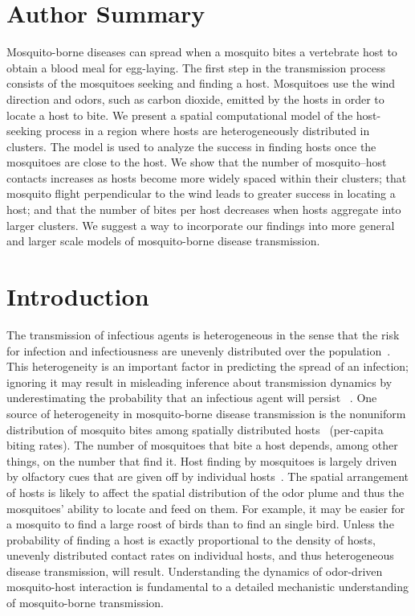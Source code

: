 \documentclass[10pt]{article}
\begin{document}
\section*{Author Summary}
Mosquito-borne diseases can spread when a mosquito bites a vertebrate host to obtain a blood meal for egg-laying.  The first step in the transmission process consists of the mosquitoes seeking and finding a host.  Mosquitoes use the wind direction and odors, such as carbon dioxide, emitted by the hosts in order to locate a host to bite.  We present a spatial computational model of the host-seeking process in a region where hosts are heterogeneously distributed in clusters.  The model is used to analyze the success in finding hosts once the mosquitoes are close to the host.  
We show that the number of mosquito--host contacts increases as hosts become more widely spaced within their clusters; that mosquito flight perpendicular to the wind leads to greater success in locating a host; and that the number of bites per host decreases when hosts aggregate into larger clusters. We suggest a way to incorporate our findings into more general and larger scale models of mosquito-borne disease transmission.

\section*{Introduction}
The transmission of infectious agents is heterogeneous in the sense that the risk for infection and infectiousness are unevenly distributed over the population~\cite{Woolhouse1997}. This heterogeneity is an important factor in predicting the spread of an infection; ignoring it may result in misleading inference about transmission dynamics by underestimating the probability that an infectious agent will persist ~\cite{Hasibeder1988}.  One source of heterogeneity in mosquito-borne disease transmission is the nonuniform distribution of mosquito bites among spatially distributed hosts~\cite{Dye1986} (per-capita biting rates). The number of mosquitoes that bite a host depends, among other things, on the number that find it.
Host finding by mosquitoes is largely driven by olfactory cues that are given off by individual
hosts~\cite{Lehane1991}.
The spatial arrangement of hosts is likely to affect the spatial distribution of the odor plume and thus the mosquitoes' ability to locate and feed on them. For example, it may be easier for a mosquito to find a large roost of birds than to find an single bird.  Unless the probability of finding a host is exactly proportional to the density of hosts, unevenly distributed contact rates on individual hosts, and thus heterogeneous disease transmission, will result.  Understanding the dynamics of odor-driven mosquito-host interaction is fundamental to a detailed mechanistic understanding of mosquito-borne transmission.
\end{document}
